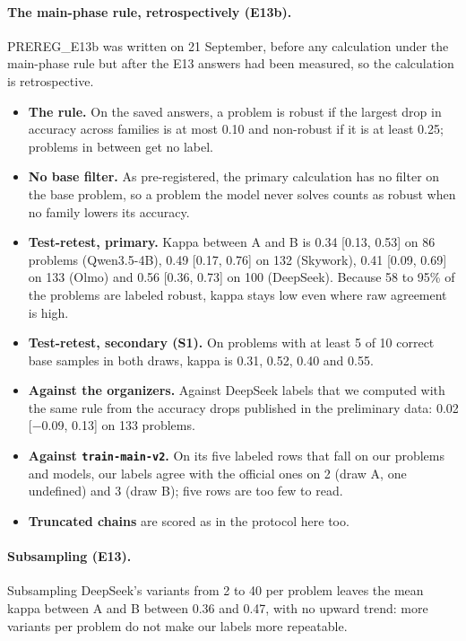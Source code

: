\paragraph{The main-phase rule, retrospectively (E13b).} PREREG\_E13b was written on 21 September, before any calculation under the main-phase rule but after the E13 answers had been measured, so the calculation is retrospective.
\begin{itemize}
\item \textbf{The rule.} On the saved answers, a problem is robust if the largest drop in accuracy across families is at most 0.10 and non-robust if it is at least 0.25; problems in between get no label.
\item \textbf{No base filter.} As pre-registered, the primary calculation has no filter on the base problem, so a problem the model never solves counts as robust when no family lowers its accuracy.
\item \textbf{Test-retest, primary.} Kappa between A and B is 0.34 [0.13, 0.53] on 86 problems (Qwen3.5-4B), 0.49 [0.17, 0.76] on 132 (Skywork), 0.41 [0.09, 0.69] on 133 (Olmo) and 0.56 [0.36, 0.73] on 100 (DeepSeek). Because 58 to 95\% of the problems are labeled robust, kappa stays low even where raw agreement is high.
\item \textbf{Test-retest, secondary (S1).} On problems with at least 5 of 10 correct base samples in both draws, kappa is 0.31, 0.52, 0.40 and 0.55.
\item \textbf{Against the organizers.} Against DeepSeek labels that we computed with the same rule from the accuracy drops published in the preliminary data: 0.02 [$-$0.09, 0.13] on 133 problems.
\item \textbf{Against \texttt{train-main-v2}.} On its five labeled rows that fall on our problems and models, our labels agree with the official ones on 2 (draw A, one undefined) and 3 (draw B); five rows are too few to read.
\item \textbf{Truncated chains} are scored as in the protocol here too.
\end{itemize}

\paragraph{Subsampling (E13).} Subsampling DeepSeek's variants from 2 to 40 per problem leaves the mean kappa between A and B between 0.36 and 0.47, with no upward trend: more variants per problem do not make our labels more repeatable.

